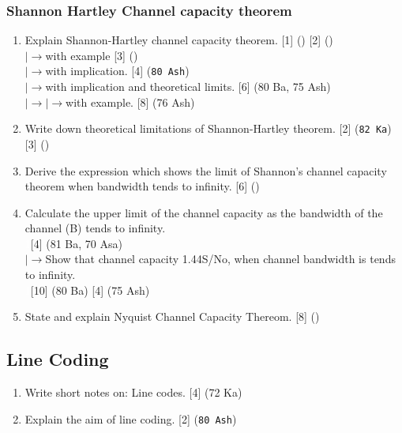 \documentclass[12pt]{article}
\newcommand{\lb}{\\$\left|\rightarrow\right.$}
\newcommand{\lo}{$\left|\rightarrow\right.$}
\newcommand{\enter}{\\\textcolor{white}{1}}
\begin{document}
    \subsubsection{Shannon Hartley Channel capacity theorem}
      \begin{enumerate}
        \item Explain Shannon-Hartley channel capacity theorem. \hfill [1] () [2] ()
          \lb with example \hfill [3] ()
          \lb with implication. \hfill [4] (\texttt{80 Ash})
          \lb with implication and theoretical limits. \hfill [6] (80 Ba, 75 Ash)
          \lb\lo with example. \hfill [8] (76 Ash)
        
        \item Write down theoretical limitations of Shannon-Hartley theorem. \hfill [2] (\texttt{82 Ka}) [3] ()
        
        \item Derive the expression which shows the limit of Shannon's channel capacity theorem when bandwidth tends to infinity. \hfill [6] ()
        
        \item Calculate the upper limit of the channel capacity as the bandwidth of the channel (B) tends to infinity.
          \enter\hfill [4] (81 Ba, 70 Asa)
        \lb Show that channel capacity 1.44S/No, when channel bandwidth is tends to infinity. 
          \enter\hfill [10] (80 Ba) [4] (75 Ash)
        
        \item State and explain Nyquist Channel Capacity Thereom. \hfill [8] ()
      \end{enumerate}

  \subsection{Line Coding}
      \begin{enumerate}
    		\item Write short notes on: Line codes. \hfill [4] (72 Ka)

        \item Explain the aim of line coding. \hfill [2] (\texttt{80 Ash})
    	\end{enumerate}
\end{document}
